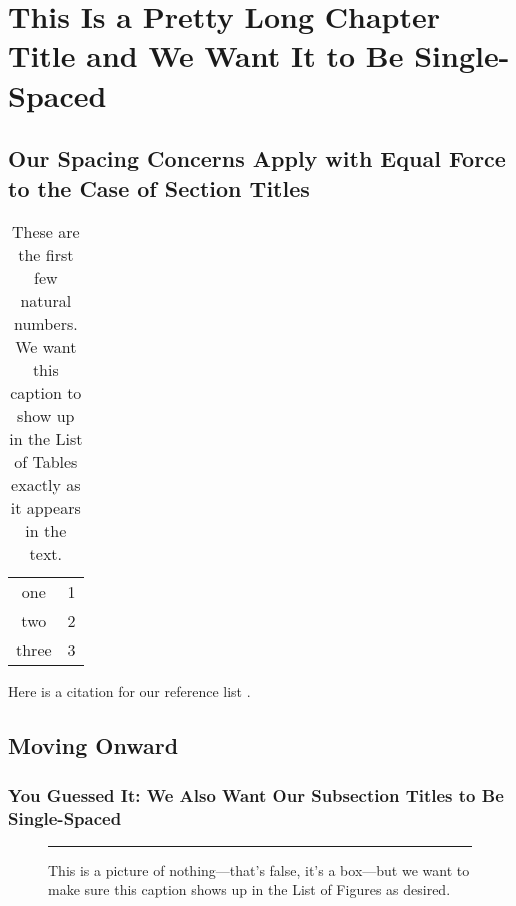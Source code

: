 \chapter{This Is a Pretty Long Chapter Title and We Want It to Be
  Single-Spaced}

\blindtext[1]

\section{Our Spacing Concerns Apply with Equal Force to the Case of Section
  Titles}

\blindtext[1]

\begin{table}[h]
  \centering
  \begin{tabular}{cc}
    one & 1 \\
    two & 2 \\
    three & 3
  \end{tabular}
  \caption{These are the first few natural numbers.  We want this caption to show up in the List of Tables exactly as it appears in the text.}
  \label{tab:mytab}
\end{table}

Here is a citation for our reference list \cite{hhgg}.

\blindtext[1]

\section{Moving Onward}

\subsection{You Guessed It: We Also Want Our Subsection Titles to Be
  Single-Spaced}

\blindtext[1]

\begin{figure}[h]
  \centering
  \rule{2cm}{2cm}
  \caption{This is a picture of nothing---that's false, it's a box---but we want to make sure this caption shows up in the List of Figures as desired.}
  \label{fig:myfig}
\end{figure}

